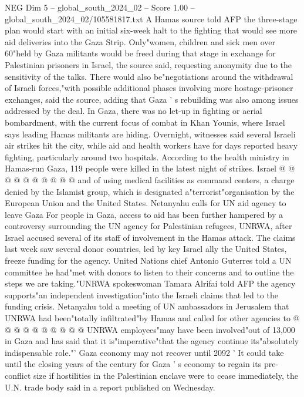 \begin{textsample}{NEG Dim 5 – global\_south\_2024\_02 – Score 1.00 – global\_south\_2024\_02/105581817.txt}  \label{ex:f5_neg_256}
A Hamas source told AFP the three-stage plan would start with an initial six-week halt to the fighting that would see more aid deliveries into the Gaza Strip.
Only"women, children and sick men over 60"held by Gaza militants would be freed during that stage in exchange for Palestinian prisoners in Israel, the source said, requesting anonymity due to the sensitivity of the talks.
There would also be"negotiations around the withdrawal of Israeli forces,"with possible additional phases involving more hostage-prisoner exchanges, said the source, adding that Gaza ' s rebuilding was also among issues addressed by the deal.
In Gaza, there was no let-up in fighting or aerial bombardment, with the current focus of combat in Khan Younis, where Israel says leading Hamas militants are hiding.
Overnight, witnesses said several Israeli air strikes hit the city, while aid and health workers have for days reported heavy fighting, particularly around two hospitals.
According to the health ministry in Hamas-run Gaza, 119 people were killed in the latest night of strikes.
Israel @ @ @ @ @ @ @ @ @ @ and of using medical facilities as command centers, a charge denied by the Islamist group, which is designated a"terrorist"organisation by the European Union and the United States.
Netanyahu calls for UN aid agency to leave Gaza For people in Gaza, access to aid has been further hampered by a controversy surrounding the UN agency for Palestinian refugees, UNRWA, after Israel accused several of its staff of involvement in the Hamas attack.
The claims last week saw several donor countries, led by key Israel ally the United States, freeze funding for the agency.
United Nations chief Antonio Guterres told a UN committee he had"met with donors to listen to their concerns and to outline the steps we are taking."UNRWA spokeswoman Tamara Alrifai told AFP the agency supports"an independent investigation"into the Israeli claims that led to the funding crisis.
Netanyahu told a meeting of UN ambassadors in Jerusalem that UNRWA had been"totally infiltrated"by Hamas and called for other agencies to @ @ @ @ @ @ @ @ @ @ UNRWA employees"may have been involved"out of 13,000 in Gaza and has said that it is"imperative"that the agency continue its"absolutely indispensable role."' Gaza economy may not recover until 2092 ' It could take until the closing years of the century for Gaza ' s economy to regain its pre-conflict size if hostilities in the Palestinian enclave were to cease immediately, the U.N. trade body said in a report published on Wednesday.

\end{textsample}
